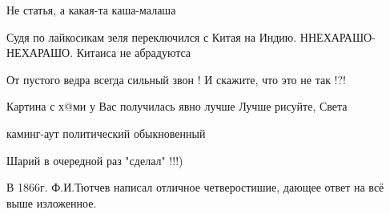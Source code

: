 \begin{itemize}
Не статья, а какая-та каша-малаша

 
Судя по лайкосикам зеля переключился с Китая на Индию. ННЕХАРАШО-НЕХАРАШО. Китаиса не абрадуютса👹👹👹

 
От пустого ведра всегда сильный звон ! И скажите, что это не так !?!

 
Картина с х@ми у Вас получилась явно лучше
Лучше рисуйте, Света

 
каминг-аут политический обыкновенный

 
Шарий в очередной раз "сделал" !!!)

 
В 1866г. Ф.И.Тютчев написал отличное четверостишие, дающее ответ на всё выше изложенное.

 

\end{itemize}
